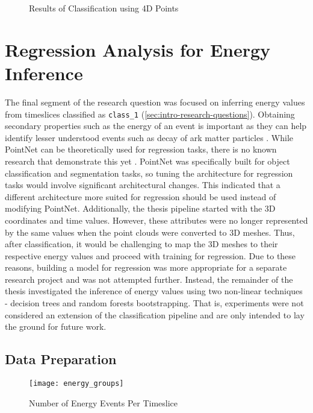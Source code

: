 \begin{figure}[ht!]   
\centering
{}
\caption[]{Results of Classification using 4D Points}
\label{fig:4d}
\end{figure}

\section{Regression Analysis for Energy Inference}
The final segment of the research question was focused on inferring energy values from timeslices classified as \texttt{class\_1} (\ref{sec:intro-research-questions}). Obtaining secondary properties such as the energy of an event is important as they can help identify lesser understood events such as decay of ark matter particles \cite{km3net_2017}. While PointNet can be theoretically used for regression tasks, there is no known research that demonstrate this yet \cite{qi2017pointnet}. PointNet was specifically built for object classification and segmentation tasks, so tuning the architecture for regression tasks would involve significant architectural changes. This indicated that a different architecture more suited for regression should be used instead of modifying PointNet. Additionally, the thesis pipeline started with the 3D coordinates and time values. However, these attributes were no longer represented by the same values when the point clouds were converted to 3D meshes. Thus, after classification, it would be challenging to map the 3D meshes to their respective energy values and proceed with training for regression. Due to these reasons, building a model for regression was more appropriate for a separate research project and was not attempted further. Instead, the remainder of the thesis investigated the inference of energy values using two non-linear techniques - decision trees and random forests bootstrapping. That is, experiments were not considered an extension of the classification pipeline and are only intended to lay the ground for future work.

\subsection{Data Preparation}

\begin{figure}[ht!]
    \centering
    \texttt{[image: energy\_groups]}
    \caption{Number of Energy Events Per Timeslice}
    \label{fig:energy_groups}
\end{figure}


